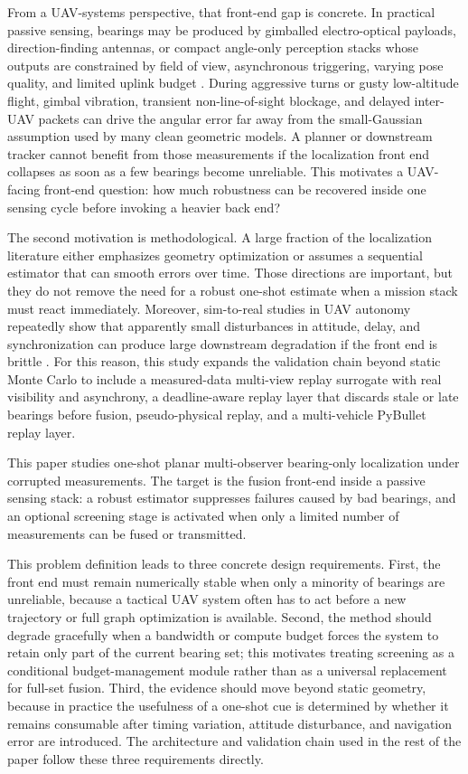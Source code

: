 \documentclass[drones,article,submit,pdftex,moreauthors]{Definitions/mdpi}
\begin{document}
From a UAV-systems perspective, that front-end gap is concrete. In practical passive sensing, bearings may be produced by gimballed electro-optical payloads, direction-finding antennas, or compact angle-only perception stacks whose outputs are constrained by field of view, asynchronous triggering, varying pose quality, and limited uplink budget \cite{chen2025research,peng2024trajectory,zhou2026target,zhang2026multi}. During aggressive turns or gusty low-altitude flight, gimbal vibration, transient non-line-of-sight blockage, and delayed inter-UAV packets can drive the angular error far away from the small-Gaussian assumption used by many clean geometric models. A planner or downstream tracker cannot benefit from those measurements if the localization front end collapses as soon as a few bearings become unreliable. This motivates a UAV-facing front-end question: how much robustness can be recovered inside one sensing cycle before invoking a heavier back end?

The second motivation is methodological. A large fraction of the localization literature either emphasizes geometry optimization or assumes a sequential estimator that can smooth errors over time. Those directions are important, but they do not remove the need for a robust one-shot estimate when a mission stack must react immediately. Moreover, sim-to-real studies in UAV autonomy repeatedly show that apparently small disturbances in attitude, delay, and synchronization can produce large downstream degradation if the front end is brittle \cite{panerati2021learning,perezsegui2023bridging}. For this reason, this study expands the validation chain beyond static Monte Carlo to include a measured-data multi-view replay surrogate with real visibility and asynchrony, a deadline-aware replay layer that discards stale or late bearings before fusion, pseudo-physical replay, and a multi-vehicle PyBullet replay layer.

This paper studies one-shot planar multi-observer bearing-only localization under corrupted measurements. The target is the fusion front-end inside a passive sensing stack: a robust estimator suppresses failures caused by bad bearings, and an optional screening stage is activated when only a limited number of measurements can be fused or transmitted.

This problem definition leads to three concrete design requirements. First, the front end must remain numerically stable when only a minority of bearings are unreliable, because a tactical UAV system often has to act before a new trajectory or full graph optimization is available. Second, the method should degrade gracefully when a bandwidth or compute budget forces the system to retain only part of the current bearing set; this motivates treating screening as a conditional budget-management module rather than as a universal replacement for full-set fusion. Third, the evidence should move beyond static geometry, because in practice the usefulness of a one-shot cue is determined by whether it remains consumable after timing variation, attitude disturbance, and navigation error are introduced. The architecture and validation chain used in the rest of the paper follow these three requirements directly.
\end{document}
